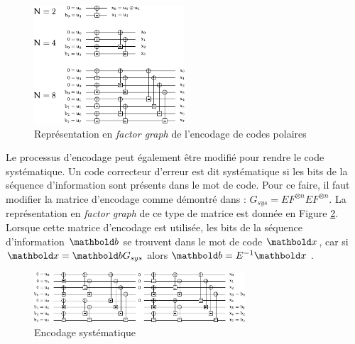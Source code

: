 \begin{figure}[t]
\centering
\includegraphics[width=0.5\textwidth]{main/ch1_fig/Graph_N_rec}
\caption{Représentation en \textit{factor graph} de l'encodage de codes polaires}
\label{fig:encodage}
\end{figure}

Le processus d'encodage peut également être modifié pour rendre le code systématique. Un code correcteur d'erreur est dit systématique si les bits de la séquence d'information sont présents dans le mot de code. Pour ce faire, il faut modifier la matrice d'encodage comme démontré dans \cite{arikan_systematic_2011} : $G_{sys}=EF^{\otimes n}EF^{\otimes n}$. La représentation en \textit{factor graph} de ce type de matrice est donnée en Figure \ref{fig:sys}. Lorsque cette matrice d'encodage est utilisée, les bits de la séquence d'information $\mb{b}$ se trouvent dans le mot de code $\mb{x}$, car si $\mb{x}=\mb{b}G_{sys}$ alors $\mb{b}=E^{-1}\mb{x}$ .

\begin{figure}[t]
\centering
\includegraphics[width=0.7\textwidth]{main/ch1_fig/Graph_N_sys}
\caption{Encodage systématique}
\label{fig:sys}
\end{figure}

